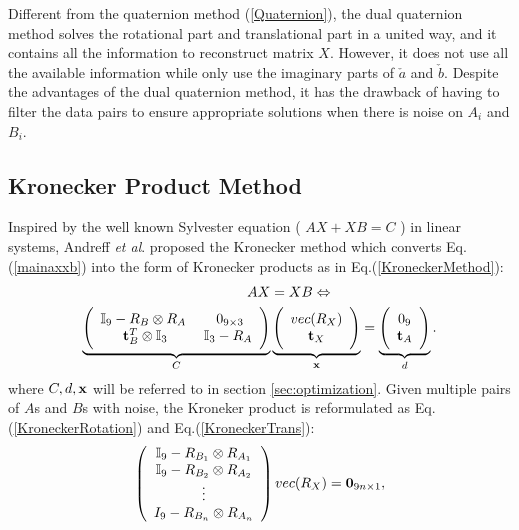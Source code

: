 \documentclass[twocolumn,10pt]{asme2ej}
\newcommand{\ttt}{{\bf t}}
\begin{document}
Different from the quaternion method (\ref{Quaternion}), the dual quaternion method solves the rotational part and translational part in a united way, and it contains all the information to reconstruct matrix $X$. However, it does not use all the available information while only use the imaginary parts of $\check{a}$ and $\check{b}$. Despite the advantages of the dual quaternion method, it has the drawback of having to filter the data pairs to ensure appropriate solutions when there is noise on $A_{i}$ and $B_{i}$.

\subsection{Kronecker Product Method }
Inspired by the well known Sylvester equation ( $AX + XB = C$ ) in linear systems, Andreff {\it et al}. \cite{andreff1999line} proposed the Kronecker method which converts  Eq.(\ref{mainaxxb}) into the form of Kronecker products \cite{andreff1999line} as in Eq.(\ref{KroneckerMethod}):
\begin{equation}
\begin{split}
AX &= XB  \Leftrightarrow\\
\underbrace{\Bigg(
\begin{array}{cc}
\mathbb{I}_{9} - R_{B} \otimes R_{A} \; & \; 0_{9 \times 3}\\
\ttt_{B}^{T} \otimes \mathbb{I}_{3} & \mathbb{I}_{3} - R_{A}
\end{array}
\Bigg)}_{C}
&\underbrace{\Bigg(
\begin{array}{c}
vec(R_{X})\\
\ttt_{X}
\end{array}
\Bigg)}_{\bf x} =
\underbrace{
\Bigg(
\begin{array}{c}
0_{9}\\
\ttt_{A}
\end{array}
\Bigg)}_{d}.
\end{split}
\label{KroneckerMethod}
\end{equation}
where $C, d, \bf x$ will be referred to in section \ref{sec:optimization}. 
Given multiple pairs of $A$s and $B$s with noise, the Kroneker product is reformulated as Eq.(\ref{KroneckerRotation}) and Eq.(\ref{KroneckerTrans}):
\begin{equation}
\left(
\begin{array}{c}
\mathbb{I}_{9} - R_{B_{1}} \otimes R_{A_{1}}\\
\mathbb{I}_{9} - R_{B_{2}} \otimes R_{A_{2}}\\
\vdots\\
I_{9} - R_{B_{n}} \otimes R_{A_{n}}
\end{array}
\right) 
vec(R_{X})
 = {\bf{0}}_{9 n \times 1},
\label{KroneckerRotation}
\end{equation}
\end{document}
